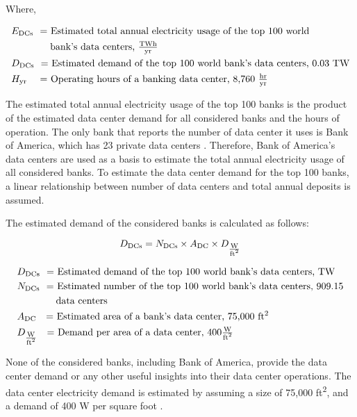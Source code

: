 \noindent
Where,

\begin{align*}
  &E_\textrm{DCs} \textrm{ \      = Estimated total annual electricity usage of the top 100 world} \\
  &\textrm{ \qquad \quad \ \ bank's data centers, } \tfrac{ \textrm{{T}Wh} } { \textrm{yr} } \\
  &D_\textrm{DCs} \textrm{ \      = Estimated demand of the top 100 world bank's data centers, 0.03 TW} \\
  &H_\textrm{yr}  \textrm{\quad \ = Operating hours of a banking data center, 8,760 $\tfrac{ \textrm{hr} } { \textrm{yr} }$}
\end{align*}


The estimated total annual electricity usage of the top 100 banks is the product of the estimated data center demand for all considered banks and the hours of operation.
The only bank that reports the number of data center it uses is Bank of America, which has 23 private data centers \cite{boa-dc-num}.
Therefore, Bank of America's data centers are used as a basis to estimate the total annual electricity usage of all considered banks.
To estimate the data center demand for the top 100 banks, a linear relationship between number of data centers and total annual deposits is assumed.

The estimated demand of the considered banks is calculated as follows:

\begin{equation}\label{eqn:banks-dc-demand}
  D_\textrm{DCs} = N_\textrm{DCs} \times A_\textrm{DC} \times D_{\tfrac{\textrm{W} } { \textrm{ft\textsuperscript{2}}}}
\end{equation}

\begin{align*}
  &D_\textrm{DCs} \textrm{ \ = Estimated demand of the top 100 world bank's data centers, TW} \\
  &N_\textrm{DCs}  \textrm{ \ = Estimated number of the top 100 world bank's data centers, 909.15} \\
  &\textrm{\qquad \qquad data centers} \\
  &A_\textrm{DC} \textrm{ \ \ = Estimated area of a bank's data center, 75,000 ft\textsuperscript{2}} \\
  &D_{\tfrac{\textrm{W} } { \textrm{ft\textsuperscript{2}}}} \textrm{ \ \ = Demand per area of a data center, $400 \tfrac{\textrm{W} } { \textrm{ft\textsuperscript{2}}}$}
\end{align*}

None of the considered banks, including Bank of America, provide the data center demand or any other useful insights into their data center operations.
The data center electricity demand is estimated by assuming a size of 75,000 ft\textsuperscript{2}, and a demand of 400 W per square foot \cite{dc-w-per-ft2}.

